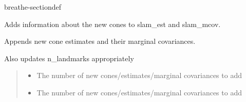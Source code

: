 \documentclass[letterpaper,10pt,english]{sphinxmanual}
\begin{document}
\begin{fulllineitems}
\begin{sphinxuseclass}{breathe-sectiondef}
\begin{fulllineitems}
\end{fulllineitems}


\begin{fulllineitems}
\label{\detokenize{isam2:_CPPv4N4slam14SLAMEstAndMCov21update_with_new_conesENSt6size_tE}}\label{\detokenize{isam2:_CPPv3N4slam14SLAMEstAndMCov21update_with_new_conesENSt6size_tE}}\label{\detokenize{isam2:_CPPv2N4slam14SLAMEstAndMCov21update_with_new_conesENSt6size_tE}}\label{\detokenize{isam2:slam::SLAMEstAndMCov::update_with_new_cones__std::s}}
\pysigstartsignatures
\pysigstartmultiline
\pysiglinewithargsret
{\label{\detokenize{isam2:classslam_1_1SLAMEstAndMCov_1a8263c13c84f96267df4d636293391745}}}
{}
{}
\pysigstopmultiline
\pysigstopsignatures
\sphinxAtStartPar
Adds information about the new cones to slam\_est and slam\_mcov. 

\sphinxAtStartPar
Appends new cone estimates and their marginal covariances.

\sphinxAtStartPar
Also updates n\_landmarks appropriately
\begin{quote}\begin{description}
\begin{itemize}
\item {} 
\sphinxAtStartPar
{} \textendash{} The number of new cones/estimates/marginal covariances to add

\item {} 
\sphinxAtStartPar
{} \textendash{} The number of new cones/estimates/marginal covariances to add 

\end{itemize}

\end{description}\end{quote}

\end{fulllineitems}



\end{sphinxuseclass}
\end{fulllineitems}
\end{document}
